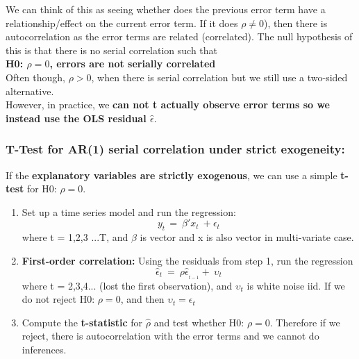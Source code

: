 \documentclass[12pt]{article}
\begin{document}
\noindent
We can think of this as seeing whether does the previous error term have a relationship/effect on the current error term. If it does $\rho \ne 0 $), then there is autocorrelation as the error terms are related (correlated). The null hypothesis of this is that there is no serial correlation such that\\
\textbf{H0: $\rho = 0 $, errors are not serially correlated}\\
Often though, $\rho > 0 $, when there is serial correlation but we still use a two-sided alternative.
\\

\noindent
However, in practice, we \textbf{can not t actually observe error terms so we instead use the OLS residual $\hat{\epsilon}$}. 
\\

\noindent
{\color{RoyalBlue}
\subsubsection{T-Test for AR(1) serial correlation under strict exogeneity:}}
\noindent
If the \textbf{explanatory variables are strictly exogenous}, we can use a simple \textbf{t-test} for H0: $\rho = 0$. 
\\

\begin{enumerate}
\item Set up a time series model and run the regression:
$$y_{t\ }=\ \beta 'x_t\ +\epsilon _t$$
where t = 1,2,3 ...T, and $\beta$ is vector and x is also vector in multi-variate case.
\item \textbf{First-order correlation: }Using the residuals from step 1, run the regression
$$\hat\epsilon_t\ =\ \rho\hat\epsilon_{_{t-1}}+\ \upsilon_t$$
where t = 2,3,4... (lost the first observation), and $\upsilon_t$ is white noise iid. If we do not reject H0: $\rho = 0$, and then $\upsilon_t = \epsilon _t$
\item Compute the \textbf{t-statistic} for $\hat{\rho}$ and test whether H0: $\rho = 0$. Therefore if we reject, there is autocorrelation with the error terms and we cannot do inferences.
\end{enumerate}
\end{document}
